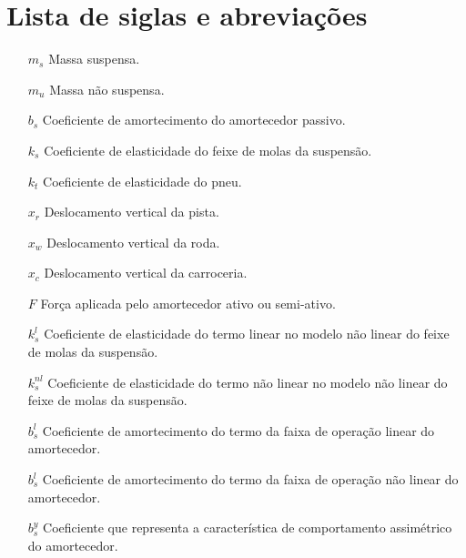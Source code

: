 \documentclass[a4paper]{ifacconf}
\begin{document}
    
    
    \appendix
    \section{Lista de siglas e abreviações}
    \begin{itemize} 
        \item [$m_s$] Massa suspensa.
        \item [$m_u$] Massa não suspensa.
        \item [$b_s$] Coeficiente de amortecimento do amortecedor passivo. 
        \item [$k_s$] Coeficiente de elasticidade do feixe de molas da suspensão.
        \item [$k_t$] Coeficiente de elasticidade do pneu.
        \item [$x_r$] Deslocamento vertical da pista.
        \item [$x_w$] Deslocamento vertical da roda.
        \item [$x_c$] Deslocamento vertical da carroceria.
        \item [$F$] Força aplicada pelo amortecedor ativo ou semi-ativo.
        \item [$k^{l}_{s}$] Coeficiente de elasticidade do termo linear no modelo não linear do feixe de molas da suspensão.
        \item [$k^{nl}_{s}$] Coeficiente de elasticidade do termo não linear no modelo não linear do feixe de molas da suspensão.
        \item [$b^{l}_{s}$] Coeficiente de amortecimento do termo da faixa de operação linear do amortecedor.
        \item [$b^{l}_{s}$] Coeficiente de amortecimento do termo da faixa de operação não linear do amortecedor.
        \item [$b^{y}_{s}$] Coeficiente que representa a característica  de comportamento assimétrico do amortecedor.
    \end{itemize}
    
\end{document}
